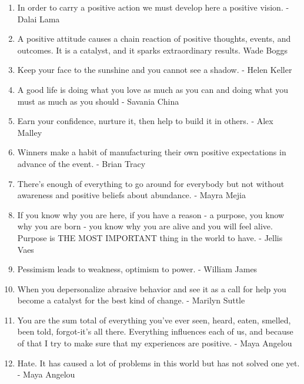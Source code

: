 \begin{enumerate}
        \item In order to carry a positive action we must develop here a positive vision. - Dalai Lama

        \item A positive attitude causes a chain reaction of positive thoughts, events, and outcomes. It is a catalyst, and it sparks extraordinary results. Wade Boggs

        \item Keep your face to the sunshine and you cannot see a shadow. - Helen Keller

        \item A good life is doing what you love as much as you can and doing what you must as much as you should - Savania China

        \item Earn your confidence, nurture it, then help to build it in others. - Alex Malley

        \item Winners make a habit of manufacturing their own positive expectations in advance of the event. - Brian Tracy

        \item There’s enough of everything to go around for everybody but not without awareness and positive beliefs about abundance. - Mayra Mejia

        \item If you know why you are here, if you have a reason - a purpose, you know why you are born - you know why you are alive and you will feel alive. Purpose is THE MOST IMPORTANT thing in the world to have. - Jellis Vaes

        \item Pessimism leads to weakness, optimism to power. - William James

        \item When you depersonalize abrasive behavior and see it as a call for help you become a catalyst for the best kind of change. - Marilyn Suttle

        \item You are the sum total of everything you’ve ever seen, heard, eaten, smelled, been told, forgot-it’s all there. Everything influences each of us, and because of that I try to make sure that my experiences are positive. - Maya Angelou


        \item Hate. It has caused a lot of problems in this world but has not solved one yet. - Maya Angelou


\end{enumerate}
